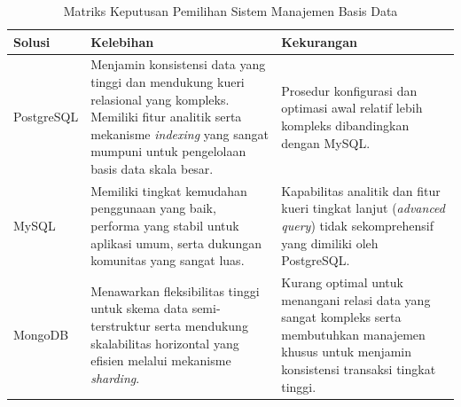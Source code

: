 \begin{table}[htbp]
    \centering
    \caption{Matriks Keputusan Pemilihan Sistem Manajemen Basis Data}
    \label{tab:matriks_database}
    \begin{tabularx}{\textwidth}{|l|X|X|}
        \hline
        \textbf{Solusi} & \textbf{Kelebihan} & \textbf{Kekurangan} \\
        \hline
        PostgreSQL & Menjamin konsistensi data yang tinggi dan mendukung kueri relasional yang kompleks. Memiliki fitur analitik serta mekanisme \textit{indexing} yang sangat mumpuni untuk pengelolaan basis data skala besar. & Prosedur konfigurasi dan optimasi awal relatif lebih kompleks dibandingkan dengan MySQL. \\
        \hline
        MySQL & Memiliki tingkat kemudahan penggunaan yang baik, performa yang stabil untuk aplikasi umum, serta dukungan komunitas yang sangat luas. & Kapabilitas analitik dan fitur kueri tingkat lanjut (\textit{advanced query}) tidak sekomprehensif yang dimiliki oleh PostgreSQL. \\
        \hline
        MongoDB & Menawarkan fleksibilitas tinggi untuk skema data semi-terstruktur serta mendukung skalabilitas horizontal yang efisien melalui mekanisme \textit{sharding}. & Kurang optimal untuk menangani relasi data yang sangat kompleks serta membutuhkan manajemen khusus untuk menjamin konsistensi transaksi tingkat tinggi. \\
        \hline
    \end{tabularx}
\end{table}
